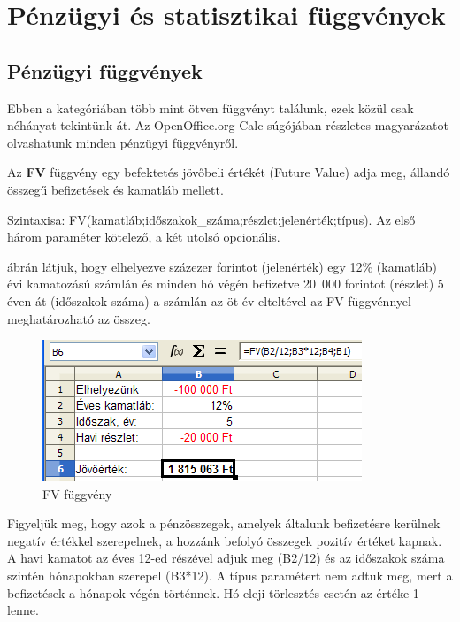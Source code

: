 \chapter{Pénzügyi és statisztikai függvények}
\thispagestyle{empty}

\section{Pénzügyi függvények}

Ebben a kategóriában több mint ötven függvényt találunk,
ezek közül csak néhányat tekintünk át. Az OpenOffice.org
Calc súgójában részletes magyarázatot olvashatunk minden
pénzügyi függvényről.

Az \textbf{FV} függvény egy befektetés jövőbeli
értékét (Future Value) adja meg, állandó összegű
befizetések és kamatláb mellett.

Szintaxisa: FV(kamatláb;időszakok\_száma;részlet;jelenérték;típus).
Az első három paraméter kötelező, a két utolsó opcionális.

 ábrán látjuk, hogy elhelyezve százezer forintot
(jelenérték) egy 12\% (kamatláb) évi kamatozású számlán
és minden hó végén befizetve 20~000 forintot (részlet) 5
éven át (időszakok száma) a számlán az öt év
elteltével az FV függvénnyel meghatározható az összeg. 

\begin{figure}[!h]
\begin{center}
\includegraphics[width=9.55cm]{oocalcv1-img125.png}
\caption{FV függvény}\label{FVFüggvény}
\end{center}
\end{figure}

Figyeljük meg, hogy azok a pénzösszegek, amelyek általunk
befizetésre kerülnek negatív értékkel szerepelnek, a
hozzánk befolyó összegek pozitív értéket kapnak. A havi
kamatot az éves 12-ed részével adjuk meg (B2/12) és az
időszakok száma szintén hónapokban szerepel (B3*12). A
típus paramétert nem adtuk meg, mert a befizetések a hónapok
végén történnek. Hó eleji törlesztés esetén az
értéke 1 lenne.

